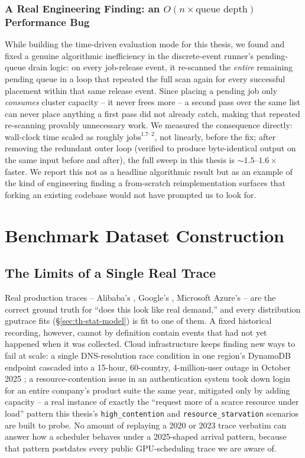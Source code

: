 \documentclass[12pt]{report}
\begin{document}
\subsection{A Real Engineering Finding: an $O(n{\times}\text{queue depth})$ Performance Bug}
\label{sec:th-perf-bug}
While building the time-driven evaluation mode for this thesis, we found
and fixed a genuine algorithmic inefficiency in the discrete-event
runner's pending-queue drain logic: on every job-release event, it
re-scanned the \emph{entire} remaining pending queue in a loop that
repeated the full scan again for every successful placement within that
same release event. Since placing a pending job only \emph{consumes}
cluster capacity -- it never frees more -- a second pass over the same
list can never place anything a first pass did not already catch, making
that repeated re-scanning provably unnecessary work. We measured the
consequence directly: wall-clock time scaled as roughly $\text{jobs}^{1.7\text{--}2}$,
not linearly, before the fix; after removing the redundant outer loop
(verified to produce byte-identical output on the same input before and
after), the full sweep in this thesis is $\sim 1.5$--$1.6\times$ faster.
We report this not as a headline algorithmic result but as an example of
the kind of engineering finding a from-scratch reimplementation surfaces
that forking an existing codebase would not have prompted us to look for.

\chapter{Benchmark Dataset Construction}
\label{ch:datasets}

\section{The Limits of a Single Real Trace}
Real production traces -- Alibaba's \citep{alibabatrace2020,alibabatrace2023},
Google's \citep{reiss2012}, Microsoft Azure's \citep{cortez2017,shahrad2020}
-- are the correct ground truth for ``does this look like real demand,''
and every distribution gputrace fits (\S\ref{sec:th-stat-model}) is fit to
one of them. A fixed historical recording, however, cannot by definition
contain events that had not yet happened when it was collected. Cloud
infrastructure keeps finding new ways to fail at scale: a single
DNS-resolution race condition in one region's DynamoDB endpoint cascaded
into a 15-hour, 60-country, 4-million-user outage in October 2025
\citep{awsoutage2025}; a resource-contention issue in an authentication
system took down login for an entire company's product suite the same
year, mitigated only by adding capacity \citep{outagestats2025} -- a real
instance of exactly the ``request more of a scarce resource under load''
pattern this thesis's \texttt{high\_contention} and
\texttt{resource\_starvation} scenarios are built to probe. No amount of
replaying a 2020 or 2023 trace verbatim can answer how a scheduler
behaves under a 2025-shaped arrival pattern, because that pattern
postdates every public GPU-scheduling trace we are aware of.
\end{document}
